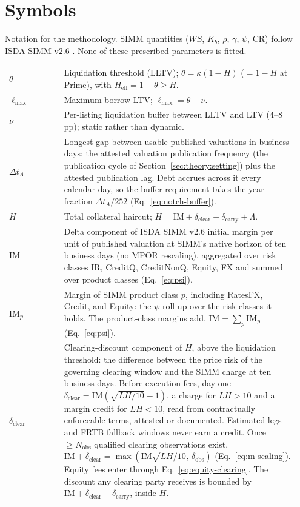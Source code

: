 \section{Symbols}
Notation for the methodology. SIMM quantities ($WS$, $K_b$,
$\rho$, $\gamma$, $\psi$, $\mathrm{CR}$) follow ISDA SIMM v2.6
\cite{isda_simm_v2_6}. None of these prescribed parameters is fitted.
\renewcommand{\arraystretch}{1.15}
\begin{longtable}{@{}p{0.18\linewidth} p{0.77\linewidth}@{}}
\toprule
$\theta$ & Liquidation threshold (LLTV); $\theta=\kappa(1-H)$ ($=1-H$ at Prime), with $H_{\mathrm{eff}}=1-\theta\ge H$.\\
$\ell_{\max}$ & Maximum borrow LTV; $\ell_{\max} = \theta - \nu$.\\
$\nu$ & Per-listing liquidation buffer between LLTV and LTV (4--8\,pp); static rather than dynamic.\\
$\Delta t_A$ & Longest gap between usable published valuations in business days: the attested valuation publication frequency (the publication cycle of Section~\ref{sec:theory:setting}) plus the attested publication lag. Debt accrues across it every calendar day, so the buffer requirement takes the year fraction $\Delta t_A/252$ (Eq.~\eqref{eq:notch-buffer}).\\
$H$ & Total collateral haircut; $H = \mathrm{IM} + \delta_{\mathrm{clear}} + \delta_{\mathrm{carry}} + \Lambda$.\\
$\mathrm{IM}$ & Delta component of ISDA SIMM v2.6 initial margin per unit of published valuation at SIMM's native horizon of ten business days (no MPOR rescaling), aggregated over risk classes IR, CreditQ, CreditNonQ, Equity, FX and summed over product classes (Eq.~\eqref{eq:psi}).\\
$\mathrm{IM}_p$ & Margin of SIMM product class $p$, including RatesFX, Credit, and Equity: the $\psi$ roll-up over the risk classes it holds. The product-class margins add, $\mathrm{IM}=\sum_p \mathrm{IM}_p$ (Eq.~\eqref{eq:psi}).\\
$\delta_{\mathrm{clear}}$ & Clearing-discount component of $H$, above the liquidation threshold: the difference between the price risk of the governing clearing window and the SIMM charge at ten business days. Before execution fees, day one $\delta_{\mathrm{clear}}=\mathrm{IM}(\sqrt{LH/10}-1)$, a charge for $LH>10$ and a margin credit for $LH<10$, read from contractually enforceable terms, attested or documented. Estimated legs and FRTB fallback windows never earn a credit. Once $\ge N_{\mathrm{obs}}$ qualified clearing observations exist, $\mathrm{IM}+\delta_{\mathrm{clear}}=\max(\mathrm{IM}\sqrt{LH/10},\,\delta_{\mathrm{obs}})$ (Eq.~\eqref{eq:m-scaling}). Equity fees enter through Eq.~\eqref{eq:equity-clearing}. The discount any clearing party receives is bounded by $\mathrm{IM}+\delta_{\mathrm{clear}}+\delta_{\mathrm{carry}}$, inside $H$.\\

\end{longtable}
